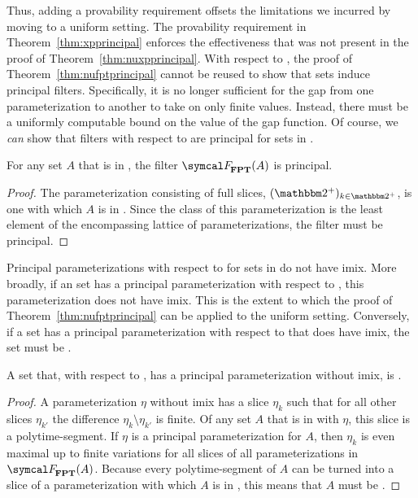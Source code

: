 Thus, adding a provability requirement offsets the limitations we incurred by moving to a uniform setting.
The provability requirement in Theorem~\ref{thm:xpprincipal} enforces the effectiveness that was not present in the proof of Theorem~\ref{thm:nuxpprincipal}.
With respect to , the proof of Theorem~\ref{thm:nufptprincipal} cannot be reused to show that  sets induce principal filters.
Specifically, it is no longer sufficient for the gap from one parameterization to another to take on only finite values.
Instead, there must be a uniformly computable bound on the value of the gap function.
Of course, we \emph{can} show that filters with respect to  are principal for sets in .
\begin{theorem}
\label{thm:fptprincipal}%
  For any set $A$ that is in , the filter $\calF_\cl{FPT}(A)$ is principal.
\end{theorem}
\begin{proof}
  The parameterization consisting of full slices, $(\binary^+)_{k \in \binary^+}$, is one with which $A$ is in .
  Since the class of this parameterization is the least element of the encompassing lattice of parameterizations, the filter must be principal.
\end{proof}

%
%
Principal parameterizations with respect to  for sets in  do not have imix.
More broadly, if an  set has a principal parameterization with respect to , this parameterization does not have imix.
This is the extent to which the proof of Theorem~\ref{thm:nufptprincipal} can be applied to the uniform setting.
Conversely, if a set has a principal parameterization with respect to  that does have imix, the set must be .
\begin{lemma}
\label{lem:fptimix}%
  A set that, with respect to , has a principal parameterization without imix, is .
\end{lemma}
\begin{proof}
  A parameterization $\eta$ without imix has a slice $\eta_k$ such that for all other slices $\eta_{k'}$ the difference $\eta_k \setminus \eta_{k'}$ is finite.
  Of any set $A$ that is in  with $\eta$, this slice is a polytime-segment.
  If $\eta$ is a principal parameterization for $A$, then $\eta_k$ is even maximal up to finite variations for all slices of all parameterizations in $\calF_\cl{FPT}(A)$.
  Because every polytime-segment of $A$ can be turned into a slice of a parameterization with which $A$ is in , this means that $A$ must be .
\end{proof}
%

